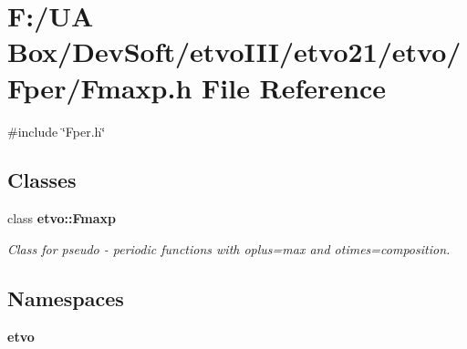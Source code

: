 \section{F\+:/\+UA Box/\+Dev\+Soft/etvo\+I\+I\+I/etvo21/etvo/\+Fper/\+Fmaxp.h File Reference}
\label{_fmaxp_8h}
{\ttfamily \#include \char`\"{}Fper.\+h\char`\"{}}\newline
\subsection*{Classes}
\begin{DoxyCompactItemize}
\item 
class \textbf{ etvo\+::\+Fmaxp}
\begin{DoxyCompactList}\small\item\em Class for pseudo -\/ periodic functions with oplus=max and otimes=composition. \end{DoxyCompactList}\end{DoxyCompactItemize}
\subsection*{Namespaces}
\begin{DoxyCompactItemize}
\item 
 \textbf{ etvo}
\end{DoxyCompactItemize}
